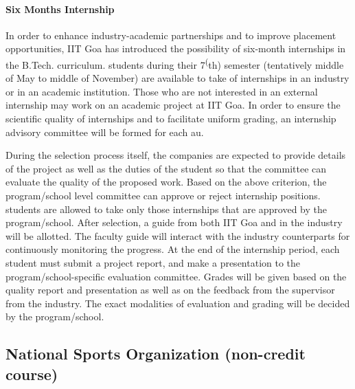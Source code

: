 \paragraph{Six Months Internship} In order to enhance industry-academic partnerships and to improve placement opportunities, IIT Goa has introduced the possibility of six-month internships in the B.Tech. curriculum. \Glspl{student} during their 7\textsuperscript(th) semester (tentatively middle of May to middle of November) are available to take of internships in an industry or in an academic institution. Those who are not interested in an external internship may work on an academic project at IIT Goa. In order to ensure the scientific quality of internships and to facilitate uniform grading, an internship advisory committee will be formed for each \acrshort{au}.

During the selection process itself, the companies are expected to provide details of the project as well as the duties of the \gls{student} so that the committee can evaluate the quality of the proposed work. Based on the above criterion, the \gls{program}/\gls{school} level committee can approve or reject internship positions. \glspl{student} are allowed to take only those internships that are approved by the \gls{program}/\gls{school}. After selection, a guide from both IIT Goa and in the industry will be allotted. The \gls{faculty} guide will interact with the industry counterparts for continuously monitoring the progress. At the end of the internship period, each \gls{student} must submit a project report, and make a presentation to the \gls{program}/\gls{school}-specific evaluation committee. Grades will be given based on the quality report and presentation as well as on the feedback from the supervisor from the industry. The exact modalities of evaluation and grading will be decided by the \gls{program}/\gls{school}.

\subsection{National Sports Organization (non-credit course)}

